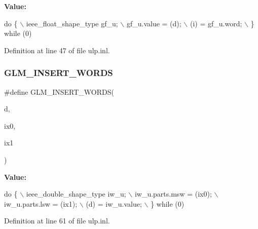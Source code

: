 {\bfseries Value\+:}
\begin{DoxyCode}
\textcolor{keywordflow}{do} \{                                    \(\backslash\)
        ieee\_float\_shape\_type gf\_u;         \(\backslash\)
        gf\_u.value = (d);                   \(\backslash\)
        (i) = gf\_u.word;                    \(\backslash\)
    \} \textcolor{keywordflow}{while} (0)
\end{DoxyCode}


Definition at line 47 of file ulp.\+inl.

\mbox{\label{ulp_8inl_ac4ec14cb5c94f0ca1d594457ee17636f}} 
\subsubsection{\texorpdfstring{G\+L\+M\+\_\+\+I\+N\+S\+E\+R\+T\+\_\+\+W\+O\+R\+DS}{GLM\_INSERT\_WORDS}}
{\footnotesize\ttfamily \#define G\+L\+M\+\_\+\+I\+N\+S\+E\+R\+T\+\_\+\+W\+O\+R\+DS(\begin{DoxyParamCaption}\item[{}]{d,  }\item[{}]{ix0,  }\item[{}]{ix1 }\end{DoxyParamCaption})}

{\bfseries Value\+:}
\begin{DoxyCode}
\textcolor{keywordflow}{do} \{                                    \(\backslash\)
        ieee\_double\_shape\_type iw\_u;        \(\backslash\)
        iw\_u.parts.msw = (ix0);             \(\backslash\)
        iw\_u.parts.lsw = (ix1);             \(\backslash\)
        (d) = iw\_u.value;                   \(\backslash\)
    \} \textcolor{keywordflow}{while} (0)
\end{DoxyCode}


Definition at line 61 of file ulp.\+inl.

\mbox{\label{ulp_8inl_ab01ab8df0632f4a5f05e00f570e6b873}} 
